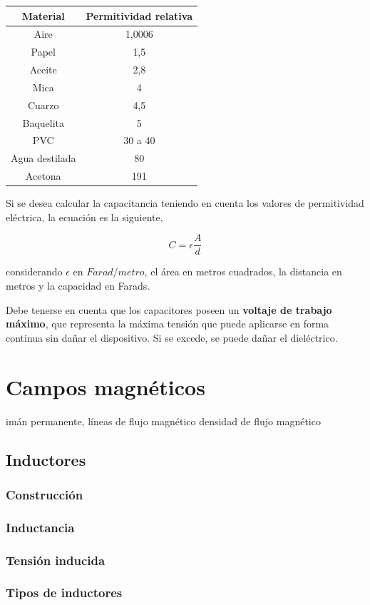 \begin{tabular}{|c|c|}
\hline 
Material & Permitividad relativa \\ 
\hline 
Aire & 1,0006 \\ 
\hline 
Papel & 1,5 \\ 
\hline 
Aceite & 2,8 \\ 
\hline 
Mica & 4 \\ 
\hline 
Cuarzo & 4,5 \\ 
\hline 
Baquelita & 5 \\ 
\hline 
PVC & 30 a 40 \\ 
\hline 
Agua destilada & 80 \\ 
\hline 
Acetona & 191 \\ 
\hline 
\end{tabular} 

Si se desea calcular la capacitancia teniendo en cuenta los valores de permitividad eléctrica, la ecuación es la siguiente,

\begin{equation}
	\label{eq:capacitancia_permitividad}
	C = \epsilon \frac{A}{d}
\end{equation}

considerando $\epsilon $ en $Farad/metro$, el área en metros cuadrados, la distancia en metros y la capacidad en Farads.

Debe tenerse en cuenta que los capacitores poseen un \textbf{voltaje de trabajo máximo}, que representa la máxima tensión que puede aplicarse en forma continua sin dañar el dispositivo. Si se excede, se puede dañar el dieléctrico.

\section{Campos magnéticos}
imán permanente, líneas de flujo magnético
densidad de flujo magnético
\subsection{Inductores}
\subsubsection{Construcción}
\subsubsection{Inductancia}
\subsubsection{Tensión inducida}
\subsubsection{Tipos de inductores}
